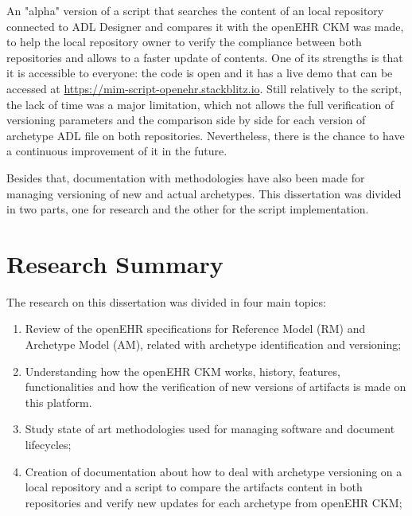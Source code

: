 \documentclass[mim_thesis.tex]{subfiles}
\begin{document}
An "alpha" version of a script that searches the content of an local repository connected to ADL Designer and compares it with the openEHR CKM was made, to help the local repository owner to verify the compliance between both repositories and allows to a faster update of contents. One of its strengths is that it is accessible to everyone: the code is open and it has a live demo that can be accessed at \url{https://mim-script-openehr.stackblitz.io}. Still relatively to the script, the lack of time was a major limitation, which not allows the full verification of versioning parameters and the comparison side by side for each version of archetype ADL file on both repositories. Nevertheless, there is the chance to have a continuous improvement of it in the future. 

Besides that, documentation with methodologies have also been made for managing versioning of new and actual archetypes. This dissertation was divided in two parts, one for research and the other for the script implementation. 



\section{Research Summary}

The research on this dissertation was divided in four main topics: 
\begin{enumerate}[noitemsep]
\item  Review of the openEHR specifications for Reference Model (RM) and 
Archetype Model (AM), related with archetype identification and versioning; 

\item Understanding how the openEHR CKM works, history, features, functionalities and how the verification of new versions of artifacts is made on this platform.

\item Study state of art methodologies used for managing software and document lifecycles;

\item Creation of documentation about how to deal with archetype versioning on a local repository and a script to compare the artifacts content in both repositories and verify new updates for each archetype from openEHR CKM; 

\end{enumerate}
\end{document}
